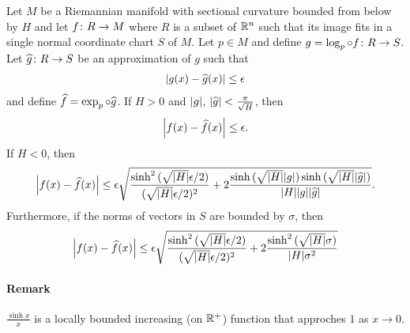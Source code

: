 \documentclass[english, a4paper, 12pt]{article}
\begin{document}
\begin{theorem}
	Let $M$ be a Riemannian manifold with sectional curvature bounded from below by $H$ and let $f \colon R \to M$ where $R$ is a subset of $\mathbb{R}^n$ such that its image fits in a single normal coordinate chart $S$ of $M$.
	Let $p \in M$ and define $g = \operatorname{log}_p \circ f \colon R \to S$.
	Let $\widehat{g} \colon R \to S$ be an approximation of $g$ such that
	\begin{align}
		\abs{g(x) - \widehat{g}(x)} \leq \epsilon
	\end{align}
	and define $\widehat{f} = \operatorname{exp}_p \circ \widehat{g}$.
	If $H > 0$ and $\abs{g}$, $\abs{\widehat{g}} < \frac{\pi}{\sqrt{H}}$, then
	\begin{align}
		\abs{f(x) - \widehat{f}(x)} \leq \epsilon.
	\end{align}
	If $H < 0$, then
	\begin{align}
		\abs{f(x) - \widehat{f}(x)} \leq \epsilon \sqrt{
			\frac{\sinh^2{(\sqrt{\abs{H}} \epsilon / 2)}}{(\sqrt{\abs{H}} \epsilon / 2)^2}
			+ 2 \frac{\sinh{(\sqrt{\abs{H}} \abs{g})} \sinh{(\sqrt{\abs{H}} \abs{\widehat{g}})}}{\abs{H}  \abs{g} \abs{\widehat{g}}}
			}.
	\end{align}
	Furthermore, if the norms of vectors in $S$ are bounded by $\sigma$, then
	\begin{align}
		\abs{f(x) - \widehat{f}(x)} \leq \epsilon \sqrt{
			\frac{\sinh^2{(\sqrt{\abs{H}} \epsilon / 2)}}{(\sqrt{\abs{H}} \epsilon / 2)^2}
			+ 2 \frac{\sinh^2{(\sqrt{\abs{H}} \sigma)}}{\abs{H} \sigma^2}
			}
	\end{align}
\end{theorem}

\paragraph{Remark} 
$\frac{\sinh{x}}{x}$ is a locally bounded increasing (on $\mathbb{R}^+$) function that approches $1$ as $x \to 0$.
\end{document}
